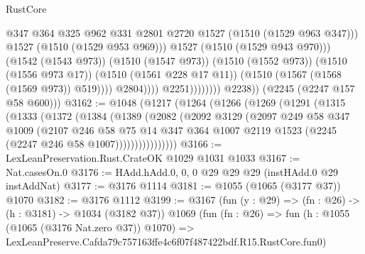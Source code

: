 \begin{lexlean}{RustCore}
\begin{coremodule}
                                            @347
                                            @364
                                            @325
                                            @962
                                            @331
                                            @2801
                                            @2720
                                            @1527
                                            (@1510 (@1529 @963 @347)))
                                          @1527
                                          (@1510 (@1529 @953 @969)))
                                        @1527
                                        (@1510 (@1529 @943 @970)))
                                      (@1542 (@1543 @973))
                                      (@1510 (@1547 @973))
                                      (@1510 (@1552 @973))
                                      (@1510 (@1556 @973 @17))
                                      (@1510 (@1561 @228 @17 @11))
                                      (@1510 (@1567 (@1568 (@1569 @973)) @519))))
                                  @2804))))
                          @2251))))))))
          @2238))
      (@2245 (@2247 @157 @58 @600)))
@3162 := @1048
    (@1217
      (@1264
        (@1266
          (@1269
            (@1291
              (@1315
                (@1333
                  (@1372
                    (@1384
                      (@1389
                        (@2082
                          (@2092
                            @3129
                            (@2097
                              @249
                              @58
                              @347
                              @1009
                              (@2107
                                @246
                                @58
                                @75
                                @14
                                @347
                                @364
                                @1007
                                @2119
                                @1523
                                (@2245 (@2247 @246 @58 @1007))))))))))))))))
@3166 := LexLeanPreservation.Rust.CrateOK @1029 @1031 @1033
@3167 := Nat.casesOn.{0}
@3176 := HAdd.hAdd.{0, 0, 0} @29 @29 @29 (instHAdd.{0} @29 instAddNat)
@3177 := @3176 @1114
@3181 := @1055 (@1065 (@3177 @37)) @1070
@3182 := @3176 @1112
@3199 := @3167
    (fun (y : @29) => (fn : @26) -> (h : @3181) -> @1034 (@3182 @37))
    @1069
    (fun (fn : @26) =>
    fun (h : @1055 (@1065 (@3176 Nat.zero @37)) @1070) =>
    LexLeanPreserve.Cafda79c757163ffe4c6f07f487422bdf.R15.RustCore.fun0)

\end{coremodule}
\end{lexlean}
